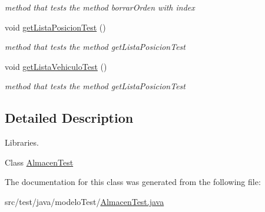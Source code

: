 \begin{DoxyCompactItemize}
\begin{DoxyCompactList}\small\item\em method that tests the method borrar\+Orden with index \end{DoxyCompactList}\item 
\mbox{\label{classmodelo_test_1_1_almacen_test_a0f7f7557a06080cb04338b5a6094dc01}} 
void \mbox{\hyperlink{classmodelo_test_1_1_almacen_test_a0f7f7557a06080cb04338b5a6094dc01}{get\+Lista\+Posicion\+Test}} ()
\begin{DoxyCompactList}\small\item\em method that tests the method get\+Lista\+Posicion\+Test \end{DoxyCompactList}\item 
\mbox{\label{classmodelo_test_1_1_almacen_test_addf4f7fcc7ecf5253ba3db2c9f91eb84}} 
void \mbox{\hyperlink{classmodelo_test_1_1_almacen_test_addf4f7fcc7ecf5253ba3db2c9f91eb84}{get\+Lista\+Vehiculo\+Test}} ()
\begin{DoxyCompactList}\small\item\em method that tests the method get\+Lista\+Posicion\+Test \end{DoxyCompactList}\end{DoxyCompactItemize}


\subsection{Detailed Description}
Libraries. 

Class \mbox{\hyperlink{classmodelo_test_1_1_almacen_test}{Almacen\+Test}} 

The documentation for this class was generated from the following file\+:\begin{DoxyCompactItemize}
\item 
src/test/java/modelo\+Test/\mbox{\hyperlink{_almacen_test_8java}{Almacen\+Test.\+java}}\end{DoxyCompactItemize}

